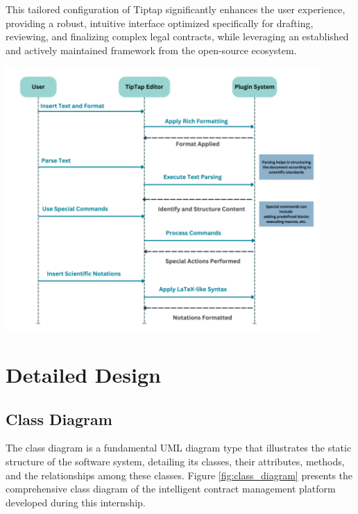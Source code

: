 This tailored configuration of Tiptap significantly enhances the user experience, providing a robust, intuitive interface optimized specifically for drafting, reviewing, and finalizing complex legal contracts, while leveraging an established and actively maintained framework from the open-source ecosystem.

\begin{center}
    \centering
    \includegraphics[width=0.9\textwidth]{Images/Tiptap Editing Framework.png}
    \label{fig:tiptap_legal_framework}
\end{center}

\section{Detailed Design}

\subsection{Class Diagram}
The class diagram is a fundamental UML diagram type that illustrates the static structure of the software system, detailing its classes, their attributes, methods, and the relationships among these classes. Figure \ref{fig:class_diagram} presents the comprehensive class diagram of the intelligent contract management platform developed during this internship.

